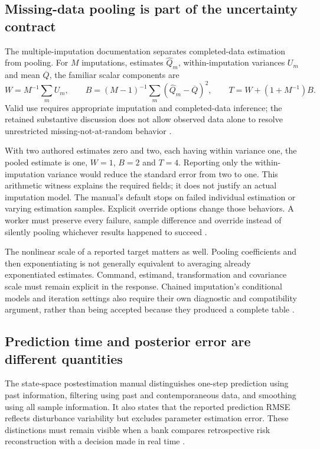 \subsection{Missing-data pooling is part of the uncertainty contract}
The multiple-imputation documentation separates completed-data estimation
from pooling. For $M$ imputations, estimates $\widehat Q_m$, within-imputation
variances $U_m$ and mean $\overline Q$, the familiar scalar components are
\[
 W=M^{-1}\sum_m U_m,\qquad
 B=(M-1)^{-1}\sum_m(\widehat Q_m-\overline Q)^2,\qquad
 T=W+(1+M^{-1})B.
\]
Valid use requires appropriate imputation and completed-data inference;
the retained substantive discussion does not allow observed data alone to
resolve unrestricted missing-not-at-random behavior
\citep{exec21_transport_stata_estimate,exec21_transport_stata_substantive}.

With two authored estimates zero and two, each having within variance one,
the pooled estimate is one, $W=1$, $B=2$ and $T=4$. Reporting only the
within-imputation variance would reduce the standard error from two to
one. This arithmetic witness explains the required fields; it does not
justify an actual imputation model. The manual's default stops on failed
individual estimation or varying estimation samples. Explicit override
options change those behaviors. A worker must preserve every failure,
sample difference and override instead of silently pooling whichever
results happened to succeed \citep{exec21_transport_stata_estimate,
exec24_stata_choice}.

The nonlinear scale of a reported target matters as well. Pooling
coefficients and then exponentiating is not generally equivalent to
averaging already exponentiated estimates. Command, estimand, transformation
and covariance scale must remain explicit in the response. Chained
imputation's conditional models and iteration settings also require their
own diagnostic and compatibility argument, rather than being accepted
because they produced a complete table
\citep{exec21_transport_stata_estimate,exec21_transport_stata_chained,
exec24_stata_choice}.

\subsection{Prediction time and posterior error are different quantities}
The state-space postestimation manual distinguishes one-step prediction
using past information, filtering using past and contemporaneous data, and
smoothing using all sample information. It also states that the reported
prediction RMSE reflects disturbance variability but excludes parameter
estimation error. These distinctions must remain visible when a bank
compares retrospective risk reconstruction with a decision made in real
time \citep{exec22_state_stata_sspace_post}.

